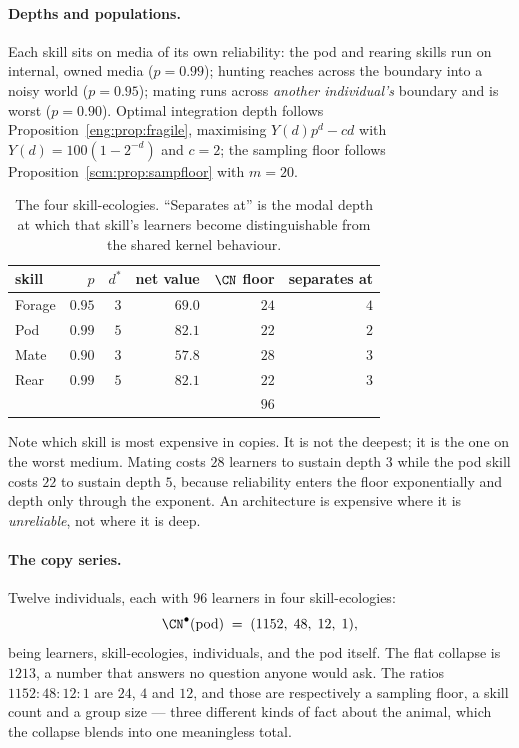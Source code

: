 \paragraph{Depths and populations.}
Each skill sits on media of its own reliability: the pod and rearing
skills run on internal, owned media ($p = 0.99$); hunting reaches across
the boundary into a noisy world ($p = 0.95$); mating runs across
\emph{another individual's} boundary and is worst ($p = 0.90$). Optimal
integration depth follows Proposition~\ref{eng:prop:fragile}, maximising
$Y(d)p^{d} - cd$ with $Y(d) = 100(1-2^{-d})$ and $c = 2$; the sampling
floor follows Proposition~\ref{scm:prop:sampfloor} with $m = 20$.

\begin{table}[h]
\centering
\begin{tabular}{lrrrrr}
\toprule
skill & $p$ & $d^\ast$ & net value & $\CN$ floor & separates at \\
\midrule
Forage & $0.95$ & $3$ & $69.0$ & $24$ & $4$ \\
Pod    & $0.99$ & $5$ & $82.1$ & $22$ & $2$ \\
Mate   & $0.90$ & $3$ & $57.8$ & $28$ & $3$ \\
Rear   & $0.99$ & $5$ & $82.1$ & $22$ & $3$ \\
\midrule
       &        &     &        & $96$ & \\
\bottomrule
\end{tabular}
\caption{The four skill-ecologies. ``Separates at'' is the modal depth at
which that skill's learners become distinguishable from the shared kernel
behaviour.}
\label{scm:tab:skills}
\end{table}

Note which skill is most expensive in copies. It is not the deepest; it is
the one on the worst medium. Mating costs $28$ learners to sustain depth
$3$ while the pod skill costs $22$ to sustain depth $5$, because
reliability enters the floor exponentially and depth only through the
exponent. An architecture is expensive where it is \emph{unreliable}, not
where it is deep.

\paragraph{The copy series.}
Twelve individuals, each with $96$ learners in four skill-ecologies:
\[
  \CN^{\bullet}(\text{pod}) \;=\; (1152,\; 48,\; 12,\; 1),
\]
being learners, skill-ecologies, individuals, and the pod itself. The flat
collapse is $1213$, a number that answers no question anyone would ask.
The ratios $1152 : 48 : 12 : 1$ are $24$, $4$ and $12$, and those are
respectively a sampling floor, a skill count and a group size --- three
different kinds of fact about the animal, which the collapse blends into
one meaningless total.

